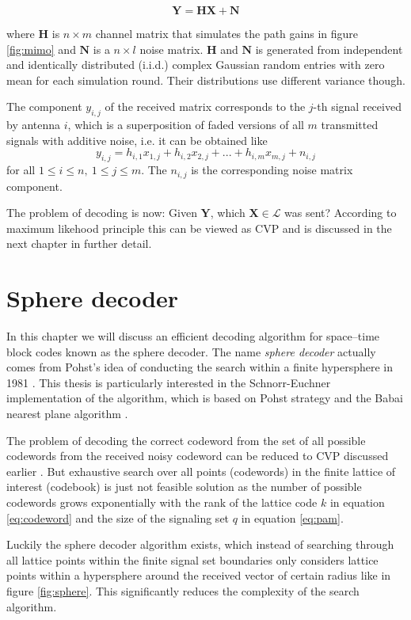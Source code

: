 \documentclass[english,12pt,a4paper,pdftex,sci,utf8]{aaltothesis}
\begin{document}
\begin{equation}
\mathbf{Y} = \mathbf{HX} + \mathbf{N}
\label{eq:system}
\end{equation}

where $\mathbf{H}$ is $n \times m$ channel matrix that simulates the path gains in figure \ref{fig:mimo} and $\mathbf{N}$ is a $n\times l$ noise matrix. $\mathbf{H}$ and $\mathbf{N}$ is generated from independent and identically distributed  (i.i.d.) complex Gaussian random entries with zero mean for each simulation round. Their distributions use different variance though. 
\par The component $y_{i,j}$ of the received matrix corresponds to the $j$-th signal received by antenna $i$, which is a superposition of faded versions of all $m$ transmitted signals with additive noise, i.e. it can be obtained like
\begin{equation}
y_{i,j} = h_{i,1}x_{1,j}+h_{i,2}x_{2,j}+...+h_{i,m}x_{m,j}+n_{i,j}   
\label{eq:component}
\end{equation}
for all $1 \leq i \leq n, \ 1 \leq j \leq m$. The $n_{i,j}$ is the corresponding noise matrix component.
\par The problem of decoding is now: Given $\mathbf{Y}$, which $\mathbf{X} \in \mathcal{L}$ was sent? According to maximum likehood principle this can be viewed as CVP \cite{mia} and is discussed in the next chapter in further detail.

\clearpage

\section{Sphere decoder}
\label{sec:sphdec}
In this chapter we will discuss an efficient decoding algorithm for space--time block codes known as the sphere decoder. The name \emph{sphere decoder} actually comes from Pohst's idea of conducting the search within a finite hypersphere in 1981 \cite{agrell}. This thesis is particularly interested in the Schnorr-Euchner implementation of the algorithm, which is based on Pohst strategy and the Babai nearest plane algorithm \cite{agrell}. 
\par The problem of decoding the correct codeword from the set of all possible codewords from the received noisy codeword can be reduced to CVP discussed earlier \cite{mia}. But exhaustive search over all points (codewords) in the finite lattice of interest (codebook) is just not feasible solution as the number of possible codewords grows exponentially with the rank of the lattice code $k$ in equation \eqref{eq:codeword} and the size of the signaling set $q$ in equation \eqref{eq:pam}. 
\par Luckily the sphere decoder algorithm exists, which instead of searching through all lattice points within the finite signal set boundaries only considers lattice points within a hypersphere around the received vector of certain radius like in figure \ref{fig:sphere}. This significantly reduces the complexity of the search algorithm. 
\end{document}
